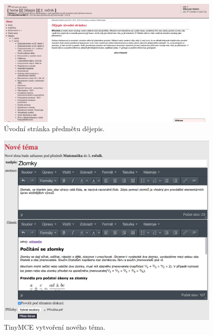 \documentclass[thesis=B,czech]{FITthesis}[2012/06/26]
\begin{document}
\begin{figure}
  \centering
	\includegraphics[scale=0.24]{screenshot1.png}
	\caption{Úvodní stránka předmětu dějepis.} \label{fig:screenshot1} 
\end{figure}


\begin{figure}
  \centering
	\includegraphics[scale=0.4]{screenshot2.png}
	\caption{TinyMCE vytvoření nového téma.} \label{fig:screenshot2} 
\end{figure}
\end{document}
